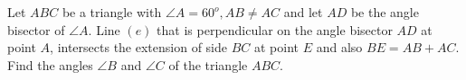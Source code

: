 Let $ABC$ be a triangle with $\angle A=60^o, AB\ne AC$ and let $AD$ be the angle bisector of $\angle A$. Line $(e)$ that is perpendicular on the angle bisector $AD$ at point $A$, intersects the extension of side $BC$ at point $E$ and also $BE=AB+AC$. Find the angles $\angle B$ and $\angle C$ of the triangle $ABC$.